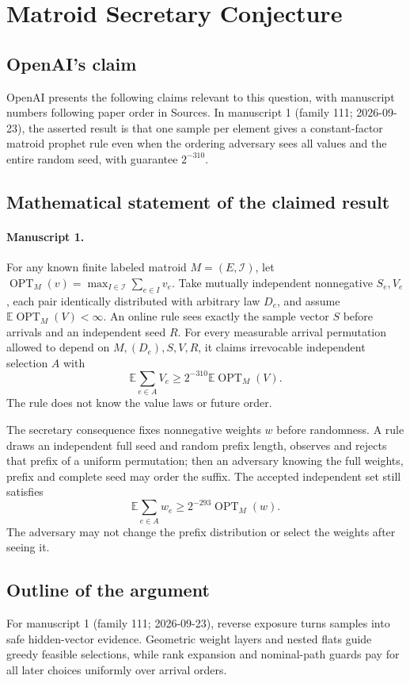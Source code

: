 \documentclass[11pt]{article}
\begin{document}
\section*{Matroid Secretary Conjecture}

\subsection{OpenAI's claim}
OpenAI presents the following claims relevant to this question, with manuscript numbers following paper order in Sources. In manuscript 1 (family 111; 2026-09-23), the asserted result is that one sample per element gives a constant-factor matroid prophet rule even when the ordering adversary sees all values and the entire random seed, with guarantee $2^{-310}$.

\subsection{Mathematical statement of the claimed result}
\paragraph{Manuscript 1.}
For any known finite labeled matroid $M=(E,\mathcal I)$, let $\operatorname{OPT}_M(v)=\max_{I\in\mathcal I}\sum_{e\in I}v_e$. Take mutually independent nonnegative $S_e,V_e$, each pair identically distributed with arbitrary law $D_e$, and assume $\mathbb E\operatorname{OPT}_M(V)<\infty$. An online rule sees exactly the sample vector $S$ before arrivals and an independent seed $R$. For every measurable arrival permutation allowed to depend on $M,(D_e),S,V,R$, it claims irrevocable independent selection $A$ with
\[
 \mathbb E\sum_{e\in A}V_e\ge2^{-310}\mathbb E\operatorname{OPT}_M(V).
\]
The rule does not know the value laws or future order.

The secretary consequence fixes nonnegative weights $w$ before randomness. A rule draws an independent full seed and random prefix length, observes and rejects that prefix of a uniform permutation; then an adversary knowing the full weights, prefix and complete seed may order the suffix. The accepted independent set still satisfies
\[
 \mathbb E\sum_{e\in A}w_e\ge2^{-293}\operatorname{OPT}_M(w).
\]
The adversary may not change the prefix distribution or select the weights after seeing it.

\subsection{Outline of the argument}
For manuscript 1 (family 111; 2026-09-23), reverse exposure turns samples into safe hidden-vector evidence. Geometric weight layers and nested flats guide greedy feasible selections, while rank expansion and nominal-path guards pay for all later choices uniformly over arrival orders.
\end{document}
